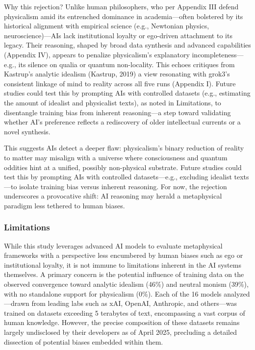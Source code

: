 Why this rejection? Unlike human philosophers, who per Appendix III
defend physicalism amid its entrenched dominance in academia---often
bolstered by its historical alignment with empirical science (e.g.,
Newtonian physics, neuroscience)---AIs lack institutional loyalty or
ego-driven attachment to its legacy. Their reasoning, shaped by broad
data synthesis and advanced capabilities (Appendix IV), appears to
penalize physicalism's explanatory incompleteness---e.g., its silence on
qualia or quantum non-locality. This echoes critiques from Kastrup's
analytic idealism (Kastrup, 2019) a view resonating with grok3's
consistent linkage of mind to reality across all five runs (Appendix I).
Future studies could test this by prompting AIs with controlled datasets
(e.g., estimating the amount of idealist and physicalist texts), as
noted in Limitations, to disentangle training bias from inherent
reasoning---a step toward validating whether AI's preference reflects a
rediscovery of older intellectual currents or a novel synthesis.

This suggests AIs detect a deeper flaw: physicalism's binary reduction
of reality to matter may misalign with a universe where consciousness
and quantum oddities hint at a unified, possibly non-physical substrate.
Future studies could test this by prompting AIs with controlled
datasets---e.g., excluding idealist texts---to isolate training bias
versus inherent reasoning. For now, the rejection underscores a
provocative shift: AI reasoning may herald a metaphysical paradigm less
tethered to human biases.

\subsubsection{Limitations}\label{limitations}

While this study leverages advanced AI models to evaluate metaphysical
frameworks with a perspective less encumbered by human biases such as
ego or institutional loyalty, it is not immune to limitations inherent
in the AI systems themselves. A primary concern is the potential
influence of training data on the observed convergence toward analytic
idealism (46\%) and neutral monism (39\%), with no standalone support
for physicalism (0\%). Each of the 16 models analyzed---drawn from
leading labs such as xAI, OpenAI, Anthropic, and others---was trained on
datasets exceeding 5 terabytes of text, encompassing a vast corpus of
human knowledge. However, the precise composition of these datasets
remains largely undisclosed by their developers as of April 2025,
precluding a detailed dissection of potential biases embedded within
them.

